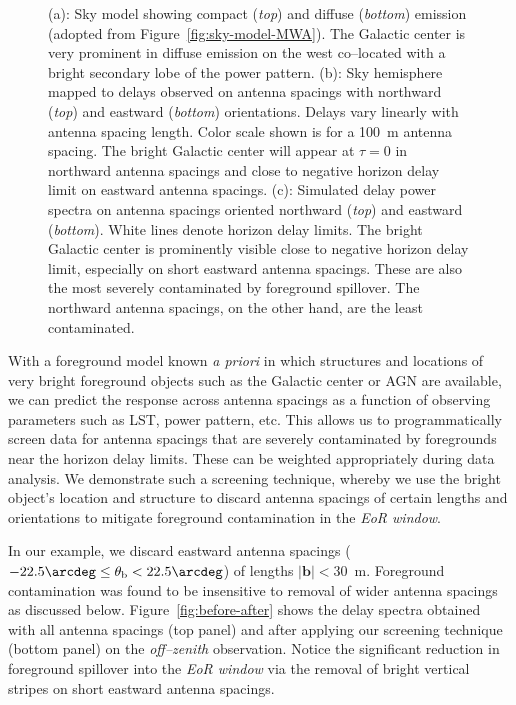 \documentclass[preprint2,iop,numberedappendix,twocolappendix,appendixfloats]{emulateapj}
\begin{document}
\begin{figure}[htb]
\caption{(a): Sky model showing compact ({\it top}) and diffuse ({\it bottom}) emission (adopted from Figure~\ref{fig:sky-model-MWA}). The Galactic center is very prominent in diffuse emission on the west co--located with a bright secondary lobe of the power pattern. (b): Sky hemisphere mapped to delays observed on antenna spacings with northward ({\it top}) and eastward ({\it bottom}) orientations. Delays vary linearly with antenna spacing length. Color scale shown is for a 100~m antenna spacing. The bright Galactic center will appear at $\tau=0$ in northward antenna spacings and close to negative horizon delay limit on eastward antenna spacings. (c): Simulated delay power spectra on antenna spacings oriented northward ({\it top}) and eastward ({\it bottom}). White lines denote horizon delay limits. The bright Galactic center is prominently visible close to negative horizon delay limit, especially on short eastward antenna spacings. These are also the most severely contaminated by foreground spillover. The northward antenna spacings, on the other hand, are the least contaminated.}
\label{fig:breakup}
\end{figure}

With a foreground model known {\it a priori} in which structures and locations of very bright foreground objects such as the Galactic center or AGN are available, we can predict the response across antenna spacings as a function of observing parameters such as LST, power pattern, etc. This allows us to programmatically screen data for antenna spacings that are severely contaminated by foregrounds near the horizon delay limits. These can be weighted appropriately during data analysis. We demonstrate such a screening technique, whereby we use the bright object's location and structure to discard antenna spacings of certain lengths and orientations to mitigate foreground contamination in the {\it EoR window}. 

In our example, we discard eastward antenna spacings ($-22.5\arcdeg\le\theta_\textrm{b}< 22.5\arcdeg$) of lengths $|\boldsymbol{b}| < 30$~m. Foreground contamination was found to be insensitive to removal of wider antenna spacings as discussed below. Figure~\ref{fig:before-after} shows the delay spectra obtained with all antenna spacings (top panel) and after applying our screening technique (bottom panel) on the {\it off--zenith} observation. Notice the significant reduction in foreground spillover into the {\it EoR window} via the removal of bright vertical stripes on short eastward antenna spacings. 
\end{document}
